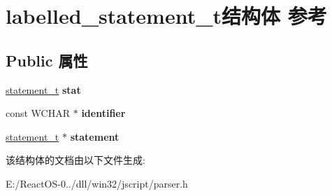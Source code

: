\hypertarget{structlabelled__statement__t}{}\section{labelled\+\_\+statement\+\_\+t结构体 参考}
\label{structlabelled__statement__t}
\subsection*{Public 属性}
\begin{DoxyCompactItemize}
\item 
\mbox{\label{structlabelled__statement__t_ad9f09443d12e85af60a357ce69d660db}} 
\hyperlink{struct__statement__t}{statement\+\_\+t} {\bfseries stat}
\item 
\mbox{\label{structlabelled__statement__t_a33b3d6e2c4c453ed474ec3e442dbb838}} 
const W\+C\+H\+AR $\ast$ {\bfseries identifier}
\item 
\mbox{\label{structlabelled__statement__t_a8ccbfee67b001b39572054e54c93777b}} 
\hyperlink{struct__statement__t}{statement\+\_\+t} $\ast$ {\bfseries statement}
\end{DoxyCompactItemize}


该结构体的文档由以下文件生成\+:\begin{DoxyCompactItemize}
\item 
E\+:/\+React\+O\+S-\/0../dll/win32/jscript/parser.\+h\end{DoxyCompactItemize}
